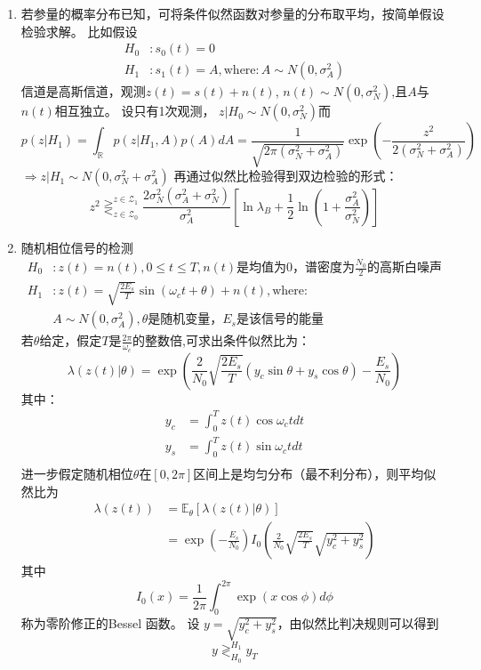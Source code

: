 \documentclass{article}
\def\E{\mathbb{E}}
\begin{document}
\begin{enumerate}
\begin{enumerate}[label=(\alph*)]
\item 若参量的概率分布已知，可将条件似然函数对参量的分布取平均，按简单假设检验求解。
比如假设
\begin{align*}
H_0 & :  s_0(t)=0 \\
H_1 & :  s_1(t)=A, \text{where}: A\sim N(0,\sigma_A^2)
\end{align*}
信道是高斯信道，观测$z(t)=s(t)+n(t)$, $n(t)\sim N(0,\sigma_N^2)$,且$A$与$n(t)$相互独立。
设只有1次观测， 
$z|H_0 \sim N(0,\sigma_N^2)$而
$$
p(z|H_1) = \int_{\mathbb{R}} p(z|H_1,A)p(A)dA=\frac{1}{\sqrt{2\pi (\sigma_N^2+\sigma_A^2)}} \exp(-\frac{z^2}{2(\sigma_N^2+\sigma_A^2)})
$$
$\Rightarrow z|H_1 \sim N(0,\sigma_N^2+\sigma_A^2)$
再通过似然比检验得到双边检验的形式：
$$
z^2 \mathop{\gtreqless}_{z\in \mathcal{Z}_0}^{z \in \mathcal{Z}_1} \frac{2\sigma_N^2(\sigma_A^2+\sigma_N^2)}{\sigma_A^2}\left[\ln \lambda_B + \frac{1}{2}\ln(1+\frac{\sigma_A^2}{\sigma_N^2})\right]
$$
\item 随机相位信号的检测
\begin{align*}
H_0 & :  z(t)=n(t),0\leq t\leq T,n(t)\text{是均值为0，谱密度为$\frac{N_0}{2}$的高斯白噪声} \\
H_1 & :  z(t)=\sqrt{\frac{2E_s}{T}}\sin(\omega_c t +\theta)+n(t), \text{where}: \\
& A\sim N(0,\sigma_A^2),\theta \text{是随机变量，$E_s$是该信号的能量}
\end{align*}
若$\theta$给定，假定$T$是$\frac{2\pi}{\omega_c}$的整数倍,可求出条件似然比为：
\begin{equation}
\lambda(z(t)|\theta) = \exp\left(\frac{2}{N_0}\sqrt{\frac{2E_s}{T}}(y_c \sin\theta + y_s \cos\theta)-\frac{E_s}{N_0}\right)
\end{equation}
其中：
\begin{align}
y_c & = \int_0^T z(t)\cos\omega_c t dt \\
y_s & = \int_0^T z(t)\sin\omega_c t dt \\
\end{align}
进一步假定随机相位$\theta$在$[0,2\pi]$区间上是均匀分布（最不利分布），则平均似然比为
\begin{align}
\lambda(z(t)) & = \E_{\theta}[\lambda(z(t)|\theta)] \\
               & = \exp(-\frac{E_s}{N_0})I_0(\frac{2}{N_0}\sqrt{\frac{2E_s}{T}}\sqrt{y_c^2+y_s^2}) \label{eq:ramdom_phase_LR}
\end{align}
其中
$$
I_0(x) = \frac{1}{2\pi}\int_0^{2\pi}\exp(x\cos\phi)d\phi
$$
称为零阶修正的Bessel 函数。
设 $ y = \sqrt{y_c^2 + y_s^2} $，由似然比判决规则可以得到
$$
y \mathop{\gtrless}_{H_0}^{H_1} y_T
$$


\end{enumerate}
\end{enumerate}
\end{document}
